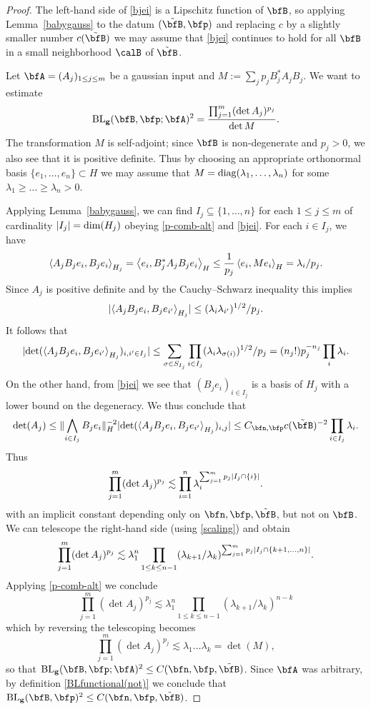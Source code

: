 \begin{proof}
The left-hand side of \eqref{bjei} is a Lipschitz function of $\bfB$, so applying Lemma~\ref{babygauss} to the datum $(\tilde{\bfB},\p)$ and replacing $c$ by a slightly smaller number $c(\tilde{\bfB})$ we may assume that \eqref{bjei} continues to hold for all $\bfB$ in a small neighborhood $\calB$ of $\tilde{\bfB}$.

Let $\A = (A_j)_{1 \leq j \leq m}$ be a gaussian input and $M := \sum_j p_j B_j^* A_j B_j$.
We want to estimate
\[
\BLg( \bfB,\p; \A)^{2} = \frac{ \prod_{j=1}^{m} (\det A_{j})^{p_{j}}}{\det M}.
\]
The transformation $M$ is self-adjoint; since $\bfB$ is non-degenerate and $p_j > 0$, we also see that it is positive definite.
Thus by choosing an appropriate orthonormal basis $\{e_1,\ldots,e_n\} \subset H$ we may assume that $M = \operatorname{diag}(\lambda_1, \ldots, \lambda_n)$ for some $\lambda_1 \geq \ldots \geq \lambda_n > 0$.

Applying Lemma~\ref{babygauss}, we can find $I_j \subseteq \{1,\ldots,n\}$ for each $1 \leq j \leq m$
of cardinality $\lvert I_j\rvert = \dim(H_j)$
obeying \eqref{p-comb-alt} and \eqref{bjei}.
For each $i \in I_j$, we have
\[ \left\langle A_j B_j e_i, B_j e_i \right\rangle_{H_j} = \left\langle e_i, B_j^* A_j B_j e_i \right\rangle_{H}
\leq \frac{1}{p_j} \left\langle e_i, Me_i \right\rangle_{H} = \lambda_i / p_j.\]
Since $A_{j}$ is positive definite and by the Cauchy--Schwarz inequality this implies
\[
\lvert\left\langle A_j B_j e_i, B_j e_{i'} \right\rangle_{H_j}\rvert \leq (\lambda_{i} \lambda_{i'})^{1/2}/p_{j}.
\]
It follows that
\[
\abs{ \det (\< A_j B_j e_i, B_j e_{i'} \>_{H_j})_{i,i' \in I_{j}} }
\leq
\sum_{\sigma \in S_{I_{j}}} \prod_{i\in I_{j}}(\lambda_{i} \lambda_{\sigma(i)})^{1/2}/p_{j}
=
(n_{j}!) p_{j}^{-n_{j}} \prod_{i} \lambda_{i}.
\]
On the other hand, from \eqref{bjei} we see that $(B_j e_i)_{i \in I_j}$ is a basis of $H_j$ with a lower bound on the degeneracy.
We thus conclude that
\[
\det(A_j)
\leq \norm{ \bigwedge_{i \in I_j} B_j e_i }_H^{-2} \abs{ \det (\< A_j B_j e_i, B_j e_{i'} \>_{H_j})_{i,j} }
\leq
C_{\bfn,\bfp} c(\tilde{\bfB})^{-2} \prod_{i \in I_j} \lambda_i.
\]
Thus
\[
\prod_{j=1}^m (\det A_j)^{p_j}
\lesssim
\prod_{i=1}^n \lambda_i^{\sum_{j=1}^m p_j \abs{I_j \cap \{i\}}}.
\]
with an implicit constant depending only on $\bfn,\p,\tilde{\bfB}$, but not on $\bfB$.
We can telescope the right-hand side (using \eqref{scaling}) and obtain
\[ \prod_{j=1}^m (\det A_j)^{p_j}
\lesssim
\lambda_{1}^{n} \prod_{1 \leq k \leq {n-1}} (\lambda_{k+1}/\lambda_k)^{\sum_{j=1}^m p_j \abs{I_j \cap \{k+1,\ldots,n\}}}.\]
Applying \eqref{p-comb-alt} we conclude
\[ \prod_{j=1}^m (\det A_j)^{p_j}
\lesssim
\lambda_{1}^{n} \prod_{1 \leq k \leq {n-1}} (\lambda_{k+1}/\lambda_k)^{n-k}\]
which by reversing the telescoping becomes
\[ \prod_{j=1}^m (\det A_j)^{p_j}
\lesssim
\lambda_1 \ldots \lambda_k
=
\det(M),\]
so that $\BLg(\bfB,\p; \bfA)^{2} \leq C(\bfn,\p,\tilde{\bfB})$.
Since $\bfA$ was arbitrary, by definition \eqref{BLfunctional(not)} we conclude that $\BLg(\bfB,\p)^{2} \leq C(\bfn,\p,\tilde{\bfB})$.


\end{proof}
